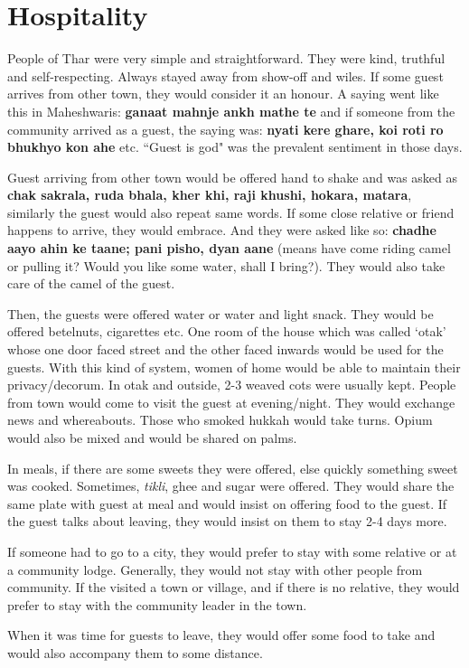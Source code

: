 \chapter{Hospitality}
People of Thar were very simple and straightforward. They were kind, truthful
and self-respecting. Always stayed away from show-off and wiles. If some guest
arrives from other town, they would consider it an honour. A saying went like
this in Maheshwaris: \textbf{ganaat mahnje ankh mathe te} and if someone from
the community arrived as a guest, the saying was: \textbf{nyati kere ghare, koi
roti ro bhukhyo kon ahe} etc. ``Guest is god" was the prevalent sentiment in
those days.

Guest arriving from other town would be offered hand to shake and was asked as
\textbf{chak sakrala, ruda bhala, kher khi, raji khushi, hokara, matara},
similarly the guest would also repeat same words. If some close relative or
friend happens to arrive, they would embrace. And they were asked like so:
\textbf{chadhe aayo ahin ke taane; pani pisho, dyan aane} (means have come
riding camel or pulling it? Would you like some water, shall I bring?). They
would also take care of the camel of the guest.

Then, the guests were offered water or water and light snack. They would be
offered betelnuts, cigarettes etc. One room of the house which was called
`otak' whose one door faced street and the other faced inwards would be used
for the guests. With this kind of system, women of home would be able to
maintain their privacy/decorum. In otak and outside, 2-3 weaved cots were
usually kept. People from town would come to visit the guest at evening/night.
They would exchange news and whereabouts. Those who smoked hukkah would take
turns. Opium would also be mixed and would be shared on palms.

In meals, if there are some sweets they were offered, else quickly something
sweet was cooked. Sometimes, \textit{tikli}, ghee and sugar were offered. They
would share the same plate with guest at meal and would insist on offering food
to the guest. If the guest talks about leaving, they would insist on them to
stay 2-4 days more.

If someone had to go to a city, they would prefer to stay with some relative or
at a community lodge. Generally, they would not stay with other people from
community. If the visited a town or village, and if there is no relative, they
would prefer to stay with the community leader in the town.

When it was time for guests to leave, they would offer some food to take and
would also accompany them to some distance.
